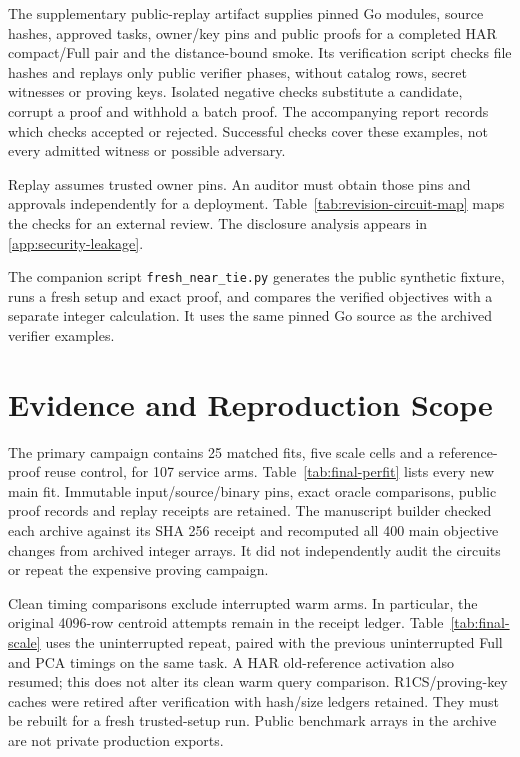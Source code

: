 \documentclass[5p,times,twocolumn]{elsarticle}
\begin{document}
The supplementary public-replay artifact supplies pinned Go modules,
source hashes, approved tasks, owner/key pins and public proofs for a
completed HAR compact/Full pair and the distance-bound smoke. Its
verification script checks file hashes and replays only public verifier
phases, without catalog rows, secret witnesses or proving keys. Isolated
negative checks substitute a candidate, corrupt a proof and withhold a
batch proof. The accompanying report records which checks accepted or
rejected. Successful checks cover these examples, not every admitted
witness or possible adversary.

Replay assumes trusted owner pins. An auditor must obtain those pins
and approvals independently for a deployment. Table~\ref{tab:revision-circuit-map}
maps the checks for an external review. The disclosure analysis appears
in \ref{app:security-leakage}.

The companion script \texttt{fresh\_near\_tie.py} generates the public
synthetic fixture, runs a fresh setup and exact proof, and compares the
verified objectives with a separate integer calculation. It uses the
same pinned Go source as the archived verifier examples.

\section{Evidence and Reproduction Scope}
\label{app:server-evidence}
The primary campaign contains 25 matched fits, five scale cells and a
reference-proof reuse control, for 107 service arms. Table~\ref{tab:final-perfit} lists every
new main fit. Immutable input/source/binary pins, exact oracle comparisons,
public proof records and replay receipts are retained. The manuscript
builder checked each archive against its SHA 256 receipt and recomputed
all 400 main objective changes from archived integer arrays. It did not
independently audit the circuits or repeat the expensive proving campaign.

Clean timing comparisons exclude interrupted warm arms. In particular,
the original 4096-row centroid attempts remain in the receipt ledger.
Table~\ref{tab:final-scale} uses the uninterrupted repeat, paired with the
previous uninterrupted Full and PCA timings on the same task. A HAR old-reference activation
also resumed; this does not alter its clean warm query comparison.
R1CS/proving-key caches were retired after verification with hash/size
ledgers retained. They must be rebuilt for a fresh trusted-setup run.
Public benchmark arrays in the archive are not private production exports.
\end{document}
